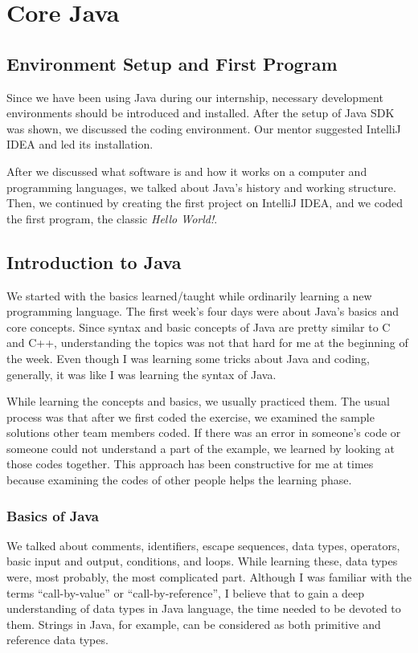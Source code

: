 \section{Core Java}

\subsection{Environment Setup and First Program}

Since we have been using Java during our internship, necessary development environments should be introduced and installed. After the setup of Java SDK was shown, we discussed the coding environment. Our mentor suggested IntelliJ IDEA and led its installation.

After we discussed what software is and how it works on a computer and programming languages, we talked about Java's history and working structure. Then, we continued by creating the first project on IntelliJ IDEA, and we coded the first program, the classic \textit{Hello World!}.


\subsection{Introduction to Java}

We started with the basics learned/taught while ordinarily learning a new programming language. The first week's four days were about Java's basics and core concepts. Since syntax and basic concepts of Java are pretty similar to C and C++, understanding the topics was not that hard for me at the beginning of the week. Even though I was learning some tricks about Java and coding, generally, it was like I was learning the syntax of Java.

While learning the concepts and basics, we usually practiced them. The usual process was that after we first coded the exercise, we examined the sample solutions other team members coded. If there was an error in someone's code or someone could not understand a part of the example, we learned by looking at those codes together. This approach has been constructive for me at times because examining the codes of other people helps the learning phase.

\subsubsection{Basics of Java}

We talked about comments, identifiers, escape sequences, data types, operators, basic input and output, conditions, and loops. While learning these, data types were, most probably, the most complicated part. Although I was familiar with the terms ``call-by-value'' or ``call-by-reference'', I believe that to gain a deep understanding of data types in Java language, the time needed to be devoted to them. Strings in Java, for example, can be considered as both primitive and reference data types.

